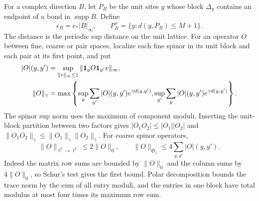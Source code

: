\documentclass[11pt,letterpaper,reqno]{amsart}
\DeclareMathOperator{\supp}{supp}
\begin{document}
For a complex direction $B$, let $P_B$ be the unit sites
$y$ whose block $\Delta_y$ contains an endpoint of a bond
in $\supp B$. Define
\[
 \epsilon_B=e_*|B|_\infty,\qquad
 P_B^+=\{y:d(y,P_B)\le M+1\}.
\]
The distance is the periodic sup distance on the unit
lattice. For an operator $O$ between fine, coarse or
pair spaces, localize each fine spinor in its unit
block and each pair at its first point, and put
\begin{align}
 |O|(y,y')&=\sup_{\|v\|_\infty\le1}
                         \|\mathbf1_yO\mathbf1_{y'}v\|_\infty,\notag\\
 \|O\|_\gamma&=\max\left\{
       \sup_y\sum_{y'}|O|(y,y')e^{\gamma d(y,y')},
       \sup_{y'}\sum_y|O|(y,y')e^{\gamma d(y,y')}\right\}.
                                  \label{eq:interacting-operator-majorants}
\end{align}
The spinor sup norm uses the maximum of component
moduli. Inserting the unit-block partition between
two factors gives
$|O_1O_2|\le|O_1||O_2|$ and
$\|O_1O_2\|_\gamma\le\|O_1\|_\gamma\|O_2\|_\gamma$.
For coarse spinor operators,
\begin{equation}\label{eq:interacting-matrix-norms}
 \|O\|_{\ell^2\to\ell^2}\le2\|O\|_0,\qquad
 \|O\|_{\mathfrak S_1}\le4\sum_{y,y'}|O|(y,y').
\end{equation}
Indeed the matrix row sums are bounded by $\|O\|_0$
and the column sums by $4\|O\|_0$, so Schur's test
gives the first bound. Polar decomposition bounds
the trace norm by the sum of all entry moduli, and
the entries in one block have total modulus at most
four times its maximum row sum.
\end{document}
